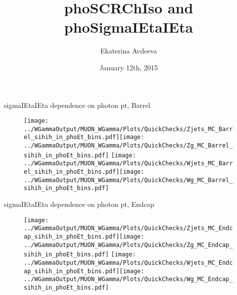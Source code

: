 \documentclass{beamer}
\title{phoSCRChIso and phoSigmaIEtaIEta}
\author{Ekaterina Avdeeva}
\institute{University of Nebraska - Lincoln}
\date{January 12th, 2015}
\begin{document}
\begin{frame}
\titlepage
\end{frame}





\begin{frame}{sigmaIEtaIEta dependence on photon pt, Barrel}
  \begin{figure}
    \centering
    \texttt{[image: ../WGammaOutput/MUON\_WGamma/Plots/QuickChecks/Zjets\_MC\_Barrel\_sihih\_in\_phoEt\_bins.pdf]}\texttt{[image: ../WGammaOutput/MUON\_WGamma/Plots/QuickChecks/Zg\_MC\_Barrel\_sihih\_in\_phoEt\_bins.pdf]}
    \texttt{[image: ../WGammaOutput/MUON\_WGamma/Plots/QuickChecks/Wjets\_MC\_Barrel\_sihih\_in\_phoEt\_bins.pdf]}\texttt{[image: ../WGammaOutput/MUON\_WGamma/Plots/QuickChecks/Wg\_MC\_Barrel\_sihih\_in\_phoEt\_bins.pdf]}
  \end{figure}
\end{frame}


\begin{frame}{sigmaIEtaIEta dependence on photon pt, Endcap}
  \begin{figure}
    \centering
    \texttt{[image: ../WGammaOutput/MUON\_WGamma/Plots/QuickChecks/Zjets\_MC\_Endcap\_sihih\_in\_phoEt\_bins.pdf]}\texttt{[image: ../WGammaOutput/MUON\_WGamma/Plots/QuickChecks/Zg\_MC\_Endcap\_sihih\_in\_phoEt\_bins.pdf]}
    \texttt{[image: ../WGammaOutput/MUON\_WGamma/Plots/QuickChecks/Wjets\_MC\_Endcap\_sihih\_in\_phoEt\_bins.pdf]}\texttt{[image: ../WGammaOutput/MUON\_WGamma/Plots/QuickChecks/Wg\_MC\_Endcap\_sihih\_in\_phoEt\_bins.pdf]}
  \end{figure}
\end{frame}
\end{document}
